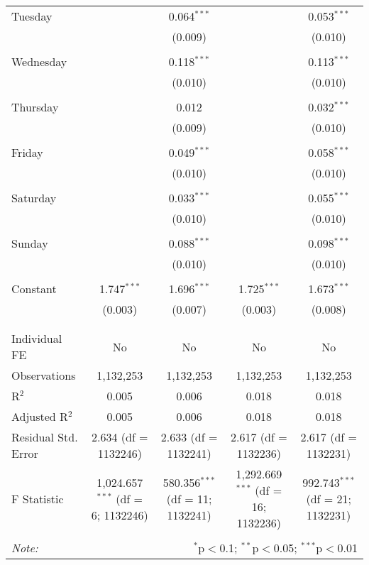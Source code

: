 \documentclass[
]{article}
\begin{document}
\begin{table}[!htbp]
{\begin{tabular}{@{\extracolsep{5pt}}lcccc}
 Tuesday &  & 0.064$^{***}$ &  & 0.053$^{***}$ \\ 
  &  & (0.009) &  & (0.010) \\ 
  & & & & \\ 
 Wednesday &  & 0.118$^{***}$ &  & 0.113$^{***}$ \\ 
  &  & (0.010) &  & (0.010) \\ 
  & & & & \\ 
 Thursday &  & 0.012 &  & 0.032$^{***}$ \\ 
  &  & (0.009) &  & (0.010) \\ 
  & & & & \\ 
 Friday &  & 0.049$^{***}$ &  & 0.058$^{***}$ \\ 
  &  & (0.010) &  & (0.010) \\ 
  & & & & \\ 
 Saturday &  & 0.033$^{***}$ &  & 0.055$^{***}$ \\ 
  &  & (0.010) &  & (0.010) \\ 
  & & & & \\ 
 Sunday &  & 0.088$^{***}$ &  & 0.098$^{***}$ \\ 
  &  & (0.010) &  & (0.010) \\ 
  & & & & \\ 
 Constant & 1.747$^{***}$ & 1.696$^{***}$ & 1.725$^{***}$ & 1.673$^{***}$ \\ 
  & (0.003) & (0.007) & (0.003) & (0.008) \\ 
  & & & & \\ 
\hline \\[-1.8ex] 
Individual FE & No & No & No & No \\ 
Observations & 1,132,253 & 1,132,253 & 1,132,253 & 1,132,253 \\ 
R$^{2}$ & 0.005 & 0.006 & 0.018 & 0.018 \\ 
Adjusted R$^{2}$ & 0.005 & 0.006 & 0.018 & 0.018 \\ 
Residual Std. Error & 2.634 (df = 1132246) & 2.633 (df = 1132241) & 2.617 (df = 1132236) & 2.617 (df = 1132231) \\ 
F Statistic & 1,024.657$^{***}$ (df = 6; 1132246) & 580.356$^{***}$ (df = 11; 1132241) & 1,292.669$^{***}$ (df = 16; 1132236) & 992.743$^{***}$ (df = 21; 1132231) \\ 
\hline 
\hline \\[-1.8ex] 
\textit{Note:}  & \multicolumn{4}{r}{$^{*}$p$<$0.1; $^{**}$p$<$0.05; $^{***}$p$<$0.01} \\ 
\end{tabular}
} 
\end{table} 
\newpage
\end{document}
